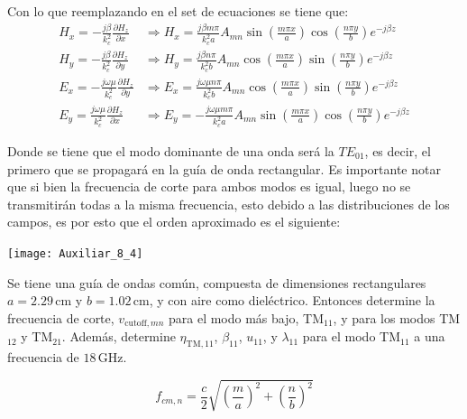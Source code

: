 \documentclass[
  11pt,
  letterpaper,
   addpoints,
   answers
  ]{exam}
\begin{document}
\begin{questions}
\begin{solution}
Con lo que reemplazando en el set de ecuaciones se tiene que:
\begin{align}
    H_x = -\frac{j\beta}{k_c^2} \frac{\partial H_z}{\partial x}
    &\Rightarrow
    H_x = \frac{j\beta m\pi}{k_c^2 a} A_{mn} \sin\left(\frac{m\pi x}{a}\right)\cos\left(\frac{n\pi y}{b}\right) e^{-j\beta z} \tag{67} \\
    H_y = -\frac{j\beta}{k_c^2} \frac{\partial H_z}{\partial y}
    &\Rightarrow
    H_y = \frac{j\beta n\pi}{k_c^2 b} A_{mn} \cos\left(\frac{m\pi x}{a}\right)\sin\left(\frac{n\pi y}{b}\right) e^{-j\beta z} \tag{68} \\
    E_x = -\frac{j\omega\mu}{k_c^2} \frac{\partial H_z}{\partial y}
    &\Rightarrow
    E_x = \frac{j\omega\mu n\pi}{k_c^2 b} A_{mn} \cos\left(\frac{m\pi x}{a}\right)\sin\left(\frac{n\pi y}{b}\right) e^{-j\beta z} \tag{69} \\
    E_y = \frac{j\omega\mu}{k_c^2} \frac{\partial H_z}{\partial x}
    &\Rightarrow
    E_y = -\frac{j\omega\mu m\pi}{k_c^2 a} A_{mn} \sin\left(\frac{m\pi x}{a}\right)\cos\left(\frac{n\pi y}{b}\right) e^{-j\beta z} \tag{70}
\end{align}

Donde se tiene que el modo dominante de una onda será la $TE_{01}$, es decir, el primero que se propagará en la guía de onda rectangular. Es importante notar que si bien la frecuencia de corte para ambos modos es igual, luego no se transmitirán todas a la misma frecuencia, esto debido a las distribuciones de los campos, es por esto que el orden aproximado es el siguiente:

\begin{center}
    \texttt{[image: Auxiliar\_8\_4]}
\end{center}

    \end{solution}
\question Se tiene una guía de ondas común, compuesta de dimensiones rectangulares $a = 2.29\,\text{cm}$ y $b = 1.02\,\text{cm}$, y con aire como dieléctrico. Entonces determine la frecuencia de corte, $v_{\text{cutoff},mn}$ para el modo más bajo, TM$_{11}$, y para los modos TM$_{12}$ y TM$_{21}$. Además, determine $\eta_{\text{TM},11}$, $\beta_{11}$, $u_{11}$, y $\lambda_{11}$ para el modo TM$_{11}$ a una frecuencia de $18\,\text{GHz}$.
\begin{solution}
    \begin{equation}
    f_{cm,n} = \frac{c}{2} \sqrt{\left(\frac{m}{a}\right)^2 + \left(\frac{n}{b}\right)^2} \tag{71}
\end{equation}


\end{solution}
\end{questions}
\end{document}
